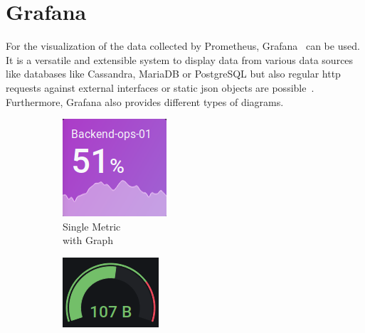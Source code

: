\section{Grafana}
\label{sec:grafana}
For the visualization of the data collected by Prometheus, Grafana~\citep{GrafanaHomepage} can be used. It is a versatile and extensible system to display data from various data sources like databases like Cassandra, MariaDB or PostgreSQL but also regular \gls{http} requests against external interfaces or static \gls{json} objects are possible~\cite{GrafanaDataSources}. Furthermore, Grafana also provides different types of diagrams.
\begin{figure}[ht]
	\begin{subfigure}{.25\textwidth}
		\centering
		\includegraphics[width=.8\linewidth]{assets/screenshots/Screenshot_2020-12-08 1 - New Features in v7 0 - Grafana.png}
		\captionsetup{justification=centering}
		\caption{Single Metric\\with Graph}
		\label{fig:sfig1}
	\end{subfigure}%
	\begin{subfigure}{.25\textwidth}
		\centering
		\includegraphics[width=.8\linewidth]{assets/screenshots/Screenshot_2020-12-08 Website trends - Grafana.png}

\end{subfigure}
\end{figure}
